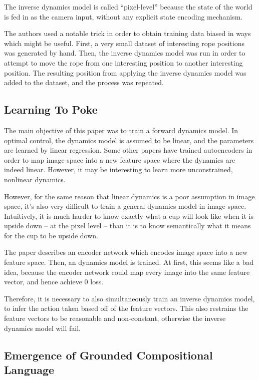 \documentclass[12pt]{article}
\begin{document}
The inverse dynamics model is called ``pixel-level'' because the state of the world is fed in as the camera input, without any explicit state encoding mechanism.

The authors used a notable trick in order to obtain training data biased in ways which might be useful. First, a very small dataset of interesting rope positions was generated by hand. Then, the inverse dynamics model was run in order to attempt to move the rope from one interesting position to another interesting position. The resulting position from applying the inverse dynamics model was added to the dataset, and the process was repeated. 

\subsection{Learning To Poke \cite{LearningToPoke}}

The main objective of this paper was to train a forward dynamics model. In optimal control, the dynamics model is assumed to be linear, and the parameters are learned by linear regression. Some other papers have trained autoencoders in order to map image-space into a new feature space where the dynamics are indeed linear. However, it may be interesting to learn more unconstrained, nonlinear dynamics.

However, for the same reason that linear dynamics is a poor assumption in image space, it's also very difficult to train a general dynamics model in image space. Intuitively, it is much harder to know exactly what a cup will look like when it is upside down -- at the pixel level -- than it is to know semantically what it means for the cup to be upside down.

The paper describes an encoder network which encodes image space into a new feature space. Then, an dynamics model is trained. At first, this seems like a bad idea, because the encoder network could map every image into the same feature vector, and hence achieve 0 loss.

Therefore, it is necessary to also simultaneously train an inverse dynamics model, to infer the action taken based off of the feature vectors. This also restrains the feature vectors to be reasonable and non-constant, otherwise the inverse dynamics model will fail.

\subsection{Emergence of Grounded Compositional Language \cite{EGCLMAP}}
\end{document}
